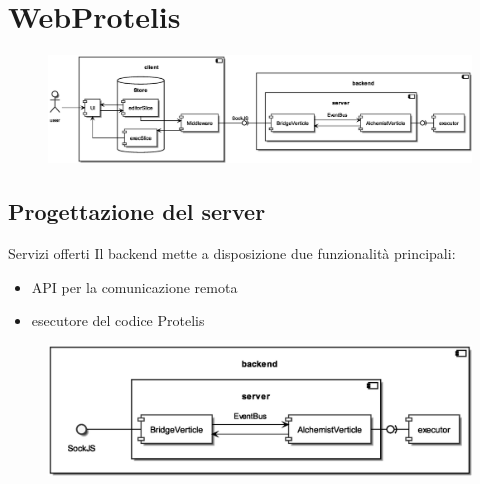 \section{WebProtelis}

  \begin{frame}{\insertsectionhead}
    \begin{figure}
      \includegraphics[width=\textwidth]{res/uml/architecture-design-detail.eps}
    \end{figure}
  \end{frame}

  \subsection{Progettazione del server}

    \begin{frame}{\insertsectionhead}{\insertsubsectionhead}

          \begin{block}{Servizi offerti}
            Il backend mette a disposizione due funzionalità principali:
            \begin{itemize}
              \item API per la comunicazione remota
              \item esecutore del codice Protelis
            \end{itemize}
          \end{block}
          \begin{figure}
            \includegraphics[width=.67\textwidth]{res/uml/architecture-design-server.eps}
          \end{figure}
    \end{frame}

